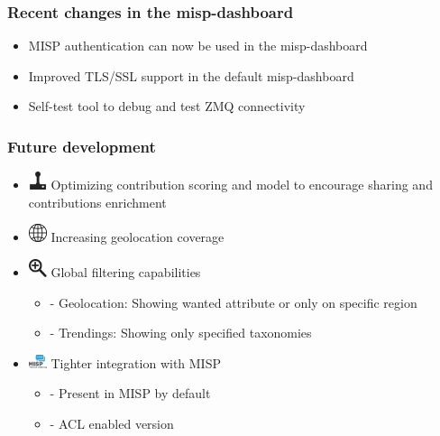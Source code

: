 \begin{frame}
        \frametitle{Recent changes in the misp-dashboard}
        \begin{itemize}
                \item MISP authentication can now be used in the misp-dashboard
                \item Improved TLS/SSL support in the default misp-dashboard
                \item Self-test tool to debug and test ZMQ connectivity
        \end{itemize}
\end{frame}

\begin{frame}
    \frametitle{Future development}
    \begin{itemize}
        \item[] \includegraphics[width=20px]{images/icons/joystick.png} \; Optimizing contribution scoring and model to encourage sharing and contributions enrichment
        \item[] \includegraphics[width=20px]{images/icons/globe.png} \; Increasing geolocation coverage
        \item[] \includegraphics[width=20px]{images/icons/zoom.png} \; Global filtering capabilities
            \begin{itemize}
                \item[] \quad - Geolocation: Showing wanted attribute or only on specific region
                \item[] \quad - Trendings: Showing only specified taxonomies
            \end{itemize}
        \item[] \includegraphics[width=20px]{images/icons/MISP.png} \; Tighter integration with MISP
            \begin{itemize}
                \item[] \quad - Present in MISP by default
                \item[] \quad - ACL enabled version
            \end{itemize}
    \end{itemize}
\end{frame}

